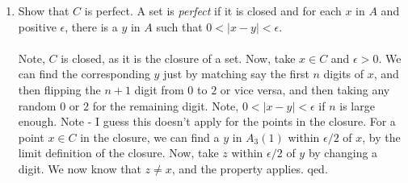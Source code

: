 \documentclass[12pt,a4paper]{article}
\newcommand{\1}[1]{\mathbbm{1}\left\{ #1 \right\}}
\begin{document}
\begin{enumerate}
	\item Show that $C$ is perfect. A set is \textit{perfect} if it is closed and for each $x$ in $A$ and positive $\epsilon$, there is a $y$ in $A$ such that $0 < |x - y| < \epsilon$.
	\\\\
	Note, $C$ is closed, as it is the closure of a set. Now, take $x \in C$ and $\epsilon > 0$. We can find the corresponding $y$ just by matching say the first $n$ digits of $x$, and then flipping the $n + 1$ digit from $0$ to $2$ or vice versa, and then taking any random $0$ or $2$ for the remaining digit. Note, $0 < |x - y| < \epsilon$ if $n$ is large enough. Note - I guess this doesn't apply for the points in the closure. For a point $x \in C$ in the closure, we can find a $y$ in $A_3(1)$ within $\epsilon/2$ of $x$, by the limit definition of the closure. Now, take $z$ within $\epsilon/2$ of $y$ by changing a digit. We now know that $z \neq x$, and the property applies. qed.
\end{enumerate}
\end{document}
